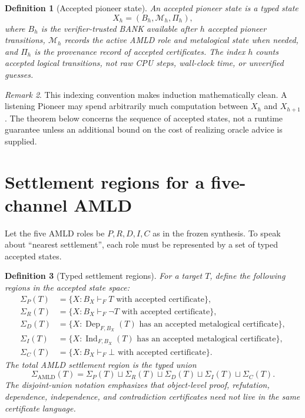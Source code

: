 \documentclass[11pt]{article}
\newtheorem{definition}{Definition}[section]
\theoremstyle{remark}
\newtheorem{remark}[definition]{Remark}
\newcommand{\Ind}{\operatorname{Ind}}
\newcommand{\Dep}{\operatorname{Dep}}
\newcommand{\AMLD}{\mathrm{AMLD}}
\newcommand{\Sett}{\Sigma}
\begin{document}
\begin{definition}[Accepted pioneer state]
An accepted pioneer state is a typed state
\[
X_h=(B_h,\mathcal M_h,\Pi_h),
\]
where $B_h$ is the verifier-trusted BANK available after $h$ accepted pioneer transitions, $\mathcal M_h$ records the active AMLD role and metalogical state when needed, and $\Pi_h$ is the provenance record of accepted certificates. The index $h$ counts accepted logical transitions, not raw CPU steps, wall-clock time, or unverified guesses.
\end{definition}

\begin{remark}
This indexing convention makes induction mathematically clean. A listening Pioneer may spend arbitrarily much computation between $X_h$ and $X_{h+1}$. The theorem below concerns the sequence of accepted states, not a runtime guarantee unless an additional bound on the cost of realizing oracle advice is supplied.
\end{remark}

\section{Settlement regions for a five-channel AMLD}

Let the five AMLD roles be $P,R,D,I,C$ as in the frozen synthesis. To speak about ``nearest settlement'', each role must be represented by a set of typed accepted states.

\begin{definition}[Typed settlement regions]
For a target $T$, define the following regions in the accepted state space:
\begin{align*}
\Sett_P(T)&=\{X: B_X\vdash_F T\text{ with accepted certificate}\},\\
\Sett_R(T)&=\{X: B_X\vdash_F \neg T\text{ with accepted certificate}\},\\
\Sett_D(T)&=\{X: \Dep_{F,B_X}(T)\text{ has an accepted metalogical certificate}\},\\
\Sett_I(T)&=\{X: \Ind_{F,B_X}(T)\text{ has an accepted metalogical certificate}\},\\
\Sett_C(T)&=\{X: B_X\vdash_F\bot\text{ with accepted certificate}\}.
\end{align*}
The total AMLD settlement region is the typed union
\[
\Sett_{\AMLD}(T)=\Sett_P(T)\sqcup\Sett_R(T)\sqcup\Sett_D(T)\sqcup\Sett_I(T)\sqcup\Sett_C(T).
\]
The disjoint-union notation emphasizes that object-level proof, refutation, dependence, independence, and contradiction certificates need not live in the same certificate language.
\end{definition}
\end{document}
